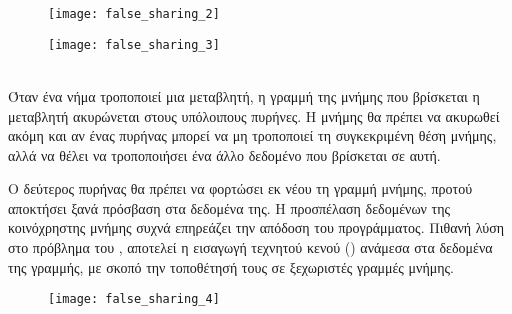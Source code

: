 \begin{center}
\begin{figure}[h]
\centering
\texttt{[image: false\_sharing\_2]}
\captionsetup{justification=centering, singlelinecheck=false}
	\caption{}
\label{fig:false_sharing_2}
\end{figure}
\end{center}


\begin{center}
\begin{figure}[h]
\centering
\texttt{[image: false\_sharing\_3]}
\captionsetup{justification=centering, singlelinecheck=false}
	\caption{}
\label{fig:false_sharing_3}
\end{figure}
\end{center}

\ \\
Όταν ένα νήμα τροποποιεί μια μεταβλητή, η γραμμή της μνήμης που βρίσκεται η μεταβλητή ακυρώνεται στους υπόλοιπους
πυρήνες. Η μνήμης θα πρέπει να ακυρωθεί ακόμη και αν ένας πυρήνας μπορεί να μη τροποποιεί τη συγκεκριμένη θέση
μνήμης, αλλά να θέλει να τροποποιήσει ένα άλλο δεδομένο που βρίσκεται σε αυτή. 

Ο δεύτερος πυρήνας θα πρέπει να φορτώσει εκ νέου τη γραμμή μνήμης, προτού αποκτήσει ξανά πρόσβαση στα δεδομένα της. Η
προσπέλαση δεδομένων της κοινόχρηστης μνήμης συχνά επηρεάζει την απόδοση του προγράμματος\cite{false_sharing}. Πιθανή λύση στο
πρόβλημα του , αποτελεί η εισαγωγή τεχνητού κενού () ανάμεσα στα δεδομένα της γραμμής, με
σκοπό την τοποθέτησή τους σε ξεχωριστές γραμμές μνήμης.
\ \\

\begin{figure}[h]
    \centering
    \texttt{[image: false\_sharing\_4]}
    \captionsetup{justification=centering, singlelinecheck=false}
	\caption{}
    \label{fig:false_sharing_4}
\end{figure}
\ \\
\clearpage
